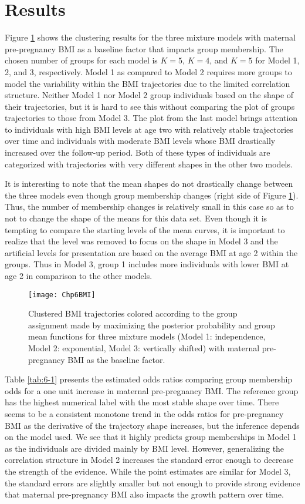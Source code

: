 \section{Results}
Figure \ref{fig:6-1} shows the clustering results for the three mixture models with maternal pre-pregnancy BMI as a baseline factor that impacts group membership. The chosen number of groups for each model is $K = 5$, $K=4$, and $K=5$ for Model 1, 2, and 3, respectively. Model 1 as compared to Model 2 requires more groups to model the variability within the BMI trajectories due to the limited correlation structure. Neither Model 1 nor Model 2 group individuals based on the shape of their trajectories, but it is hard to see this without comparing the plot of groups trajectories to those from Model 3. The plot from the last model brings attention to individuals with high BMI levels at age two with relatively stable trajectories over time and individuals with moderate BMI levels whose BMI drastically increased over the follow-up period. Both of these types of individuals are categorized with trajectories with very different shapes in the other two models.

It is interesting to note that the mean shapes do not drastically change between the three models even though group membership changes (right side of Figure \ref{fig:6-1}). Thus, the number of membership changes is relatively small in this case so as to not to change the shape of the means for this data set. Even though it is tempting to compare the starting levels of the mean curves, it is important to realize that the level was removed to focus on the shape in Model 3 and the artificial levels for presentation are based on the average BMI at age 2 within the groups. Thus in Model 3, group 1 includes more individuals with lower BMI at age 2 in comparison to the other models. 

\begin{figure}[ht]
\centering
\texttt{[image: Chp6BMI]}
\caption{Clustered BMI trajectories colored according to the group assignment made by maximizing the posterior probability and group mean functions for three mixture models (Model 1: independence, Model 2: exponential, Model 3: vertically shifted) with maternal pre-pregnancy BMI as the baseline factor.}
\label{fig:6-1}
\end{figure}

Table \ref{tab:6-1} presents the estimated odds ratios comparing group membership odds for a one unit increase in maternal pre-pregnancy BMI. The reference group has the highest numerical label with the most stable shape over time. There seems to be a consistent monotone trend in the odds ratios for pre-pregnancy BMI as the derivative of the trajectory shape increases, but the inference depends on the model used. We see that it highly predicts group memberships in Model 1 as the individuals are divided mainly by BMI level. However, generalizing the correlation structure in Model 2 increases the standard error enough to decrease the strength of the evidence. While the point estimates are similar for Model 3, the standard errors are slightly smaller but not enough to provide strong evidence that maternal pre-pregnancy BMI also impacts the growth pattern over time. 

